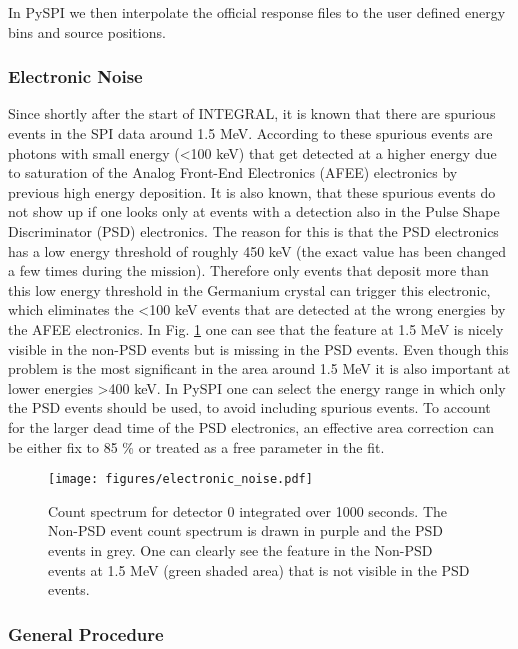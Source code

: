 \documentclass[twocolumn]{aa}
\begin{document}
In PySPI we then interpolate the official response files to the user defined energy bins and source positions.

\subsubsection*{Electronic Noise}

Since shortly after the start of INTEGRAL, it is known that there are spurious events in the SPI data around 1.5 MeV. According to \citet{spi_electronic_noise} these spurious events are photons with small energy (<100 keV) that get detected at a higher energy due to saturation of the Analog Front-End Electronics (AFEE) electronics by previous high energy deposition. It is also known, that these spurious events do not show up if one looks only at events with a detection also in the Pulse Shape Discriminator (PSD) electronics. The reason for this is that the PSD electronics has a low energy threshold of roughly 450 keV (the exact value has been changed a few times during the mission). Therefore only events that deposit more than this low energy threshold in the Germanium crystal can trigger this electronic, which eliminates the <100 keV events that are detected at the wrong energies by the AFEE electronics. In Fig. \ref{fig:electronic} one can see that the feature at 1.5 MeV is nicely visible in the non-PSD events but is missing in the PSD events. Even though this problem is the most significant in the area around 1.5 MeV it is also important at lower energies >400 keV. In PySPI one can select the energy range in which only the PSD events should be used, to avoid including spurious events. To account for the larger dead time of the PSD electronics, an effective area correction can be either fix to 85 \% \citep{spi_electronic_noise} or treated as a free parameter in the fit.

\begin{figure}
    \begin{centering}
        \texttt{[image: figures/electronic\_noise.pdf]}
        \caption{Count spectrum for detector 0 integrated over 1000 seconds. The Non-PSD event count spectrum is drawn in purple and the PSD events in grey. One can clearly see the feature in the Non-PSD events at 1.5 MeV (green shaded area) that is not visible in the PSD events.}
        \label{fig:electronic}
    \end{centering}
\end{figure}

\subsubsection*{General Procedure}
\end{document}
